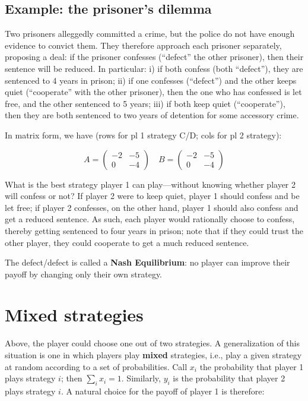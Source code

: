 \documentclass[]{book}
\begin{document}
\hypertarget{example-the-prisoners-dilemma}{%
\subsection{Example: the prisoner's dilemma}\label{example-the-prisoners-dilemma}}

Two prisoners alleggedly committed a crime, but the police do not have enough evidence to convict them. They therefore approach each prisoner separately, proposing a deal: if the prisoner confesses (``defect'' the other prisoner), then their sentence will be reduced. In particular: i) if both confess (both ``defect''), they are sentenced to 4 years in prison; ii) if one confesses (``defect'') and the other keeps quiet (``cooperate'' with the other prisoner), then the one who has confessed is let free, and the other sentenced to 5 years; iii) if both keep quiet (``cooperate''), then they are both sentenced to two years of detention for some accessory crime.

In matrix form, we have (rows for pl 1 strategy C/D; cols for pl 2 strategy):

\[
A = \begin{pmatrix}
-2 & -5\\
0 & -4
\end{pmatrix} \quad
B = \begin{pmatrix}
-2 & -5\\
0 & -4
\end{pmatrix}
\]

What is the best strategy player 1 can play---without knowing whether player 2 will confess or not? If player 2 were to keep quiet, player 1 should confess and be let free; if player 2 confesses, on the other hand, player 1 should also confess and get a reduced sentence. As such, each player would rationally choose to confess, thereby getting sentenced to four years in prison; note that if they could trust the other player, they could cooperate to get a much reduced sentence.

The defect/defect is called a \textbf{Nash Equilibrium}: no player can improve their payoff by changing only their own strategy.

\hypertarget{mixed-strategies}{%
\section{Mixed strategies}\label{mixed-strategies}}

Above, the player could choose one out of two strategies. A generalization of this situation is one in which players play \textbf{mixed} strategies, i.e., play a given strategy at random according to a set of probabilities. Call \(x_i\) the probability that player 1 plays strategy \(i\); then \(\sum_i x_i = 1\). Similarly, \(y_i\) is the probability that player 2 plays strategy \(i\). A natural choice for the payoff of player 1 is therefore:
\end{document}

